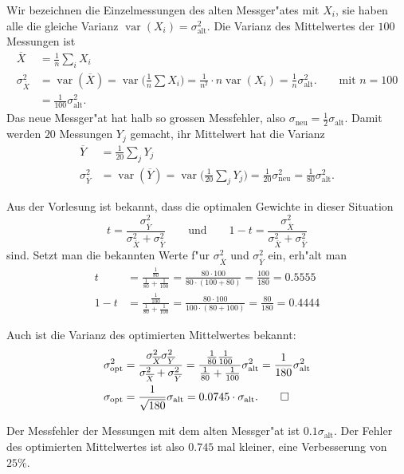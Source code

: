 \begin{loesung}
Wir bezeichnen die Einzelmessungen des alten Messger"ates mit $X_i$, sie
haben alle die gleiche Varianz $\operatorname{var}(X_i)=\sigma_{\text{alt}}^2$.
Die Varianz des Mittelwertes der $100$ Messungen ist
\begin{align*}
\overline X
&=
\frac1n\sum_i X_i
\\
\sigma_{\overline X}^2
&=
\operatorname{var}(\overline X)
=
\operatorname{var}\biggl(\frac1n\sum X_i\biggr)
=
\frac1{n^2}\cdot n\operatorname{var}(X_i)=\frac1n\sigma_{\text{alt}}^2.
\qquad\text{mit $n=100$}
\\
&=\frac1{100}\sigma_{\text{alt}}^2.
\end{align*}
Das neue Messger"at hat halb so grossen Messfehler, also
$\sigma_{\text{neu}}=\frac12\sigma_{\text{alt}}$.
Damit werden $20$ Messungen $Y_j$ gemacht, ihr Mittelwert hat die Varianz
\begin{align*}
\overline Y
&=
\frac1{20}\sum_j Y_j
\\
\sigma_{\overline Y}^2
&=
\operatorname{var}(\overline Y)
=
\operatorname{var}\biggl(\frac1{20}\sum_j Y_j\biggr)
=
\frac1{20}\sigma_{\text{neu}}^2
=
\frac1{80}\sigma_{\text{alt}}^2.
\end{align*}
\begin{teilaufgaben}
\item
Aus der Vorlesung ist bekannt, dass die optimalen Gewichte in dieser
Situation
\[
t
=
\frac{\sigma_{\overline Y}^2}{\sigma_{\overline X}^2 + \sigma_{\overline Y}^2}
\qquad\text{und}\qquad
1-t
=
\frac{\sigma_{\overline X}^2}{\sigma_{\overline X}^2 + \sigma_{\overline Y}^2}
\]
sind.
Setzt man die bekannten Werte f"ur $\sigma_{\overline X}^2$ und
$\sigma_{\overline Y}^2$ ein, erh"alt man
\begin{align*}
t
&=
\frac{\frac1{80}}{\frac1{80}+\frac1{100}}
=
\frac{80\cdot 100}{80\cdot(100+80)}
=
\frac{100}{180}=0.5555
\\
1-t
&=
\frac{\frac1{100}}{\frac1{80}+\frac1{100}}
=
\frac{80\cdot 100}{100\cdot(80+100)}
=
\frac{80}{180}
=
0.4444
\end{align*}
\item
Auch ist die Varianz des optimierten Mittelwertes bekannt:
\begin{align*}
\sigma_{\text{opt}}^2
&=
\frac{\sigma_{\overline X}^2\sigma_{\overline Y}^2}{\sigma_{\overline X}^2 +\sigma_{\overline Y}^2}
=
\frac{\frac1{80}\frac1{100}}{\frac1{80}+\frac1{100}}\sigma_{\text{alt}}^2
=
\frac1{180}\sigma_{\text{alt}}^2
\\
\sigma_{\text{opt}}
&=
\frac1{\sqrt{180}}\sigma_{\text{alt}}
=
0.0745\cdot\sigma_{\text{alt}}.
\qedhere
\end{align*}
\item
Der Messfehler der Messungen mit dem alten Messger"at ist
$0.1\sigma_{\text{alt}}$.
Der Fehler des optimierten Mittelwertes ist also $0.745$ mal kleiner,
eine Verbesserung von $25\%$.
\end{teilaufgaben}
\end{loesung}

